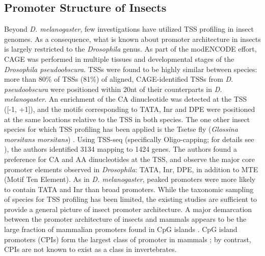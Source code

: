 \documentclass[runningheads,a4paper]{llncs}
\begin{document}
\begin{linenumbers}
\subsection{Promoter Structure of Insects}
Beyond \textit{D. melanogaster}, few investigations have utilized TSS profiling in insect genomes. 
As a consequence, what is known about promoter architecture in insects is largely restricted to the \textit{Drosophila} genus. 
As part of the modENCODE effort, CAGE was performed in multiple tissues and developmental stages of the \textit{Drosophila pseudoobscura}. 
TSSs were found to be highly similar between species: more than 80\% of TSSs (81\%) of aligned, CAGE-identified TSSs from \textit{D. pseudoobscura} were positioned within 20nt of their counterparts in \textit{D. melanogaster}.
An enrichment of the CA dinucleotide was detected at the TSS ([-1, +1]), and the motifs corresponding to TATA, Inr and DPE were positioned at the same locations relative to the TSS in both species.
The one other insect species for which TSS profiling has been applied is the Tsetse fly (\textit{Glossina morsitans morsitans}) \cite{Mwangi:2015kn}. 
Using TSS-seq (specifically Oligo-capping; for details see \cite{Tsuchihara:2009dm}), the authors identified 3134 mapping to 1424 genes. 
The authors found a preference for CA and AA dinucleotides at the TSS, and observe the major core promoter elements observed in \textit{Drosophila}: TATA, Inr, DPE, in addition to MTE (Motif Ten Element).
As in \textit{D. melanogaster}, peaked promoters were more likely to contain TATA and Inr than broad promoters. 
While the taxonomic sampling of species for TSS profiling has been limited, the existing studies are sufficient to provide a general picture of insect promoter architecture.
A major demarcation between the promoter architecture of insects and mammals appears to be the large fraction of mammalian promoters found in CpG islands \cite{Mwangi:2015kn}.
CpG island promoters (CPIs) form the largest class of promoter in mammals \cite{Cvetesic:2017hl}; by contrast, CPIs are not known to exist as a class in invertebrates.



\end{linenumbers}
\end{document}
